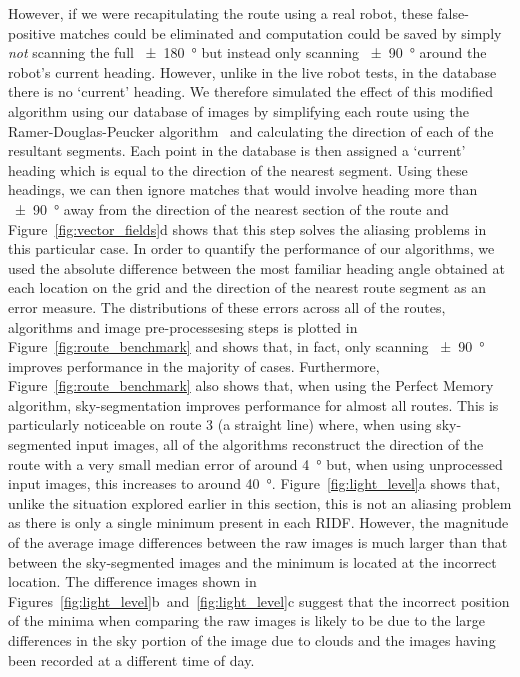 \documentclass[letterpaper]{article}
\begin{document}
However, if we were recapitulating the route using a real robot, these false-positive matches could be eliminated and computation could be saved by simply \emph{not} scanning the full \SI{\pm 180}{\degree} but instead only scanning \SI{\pm 90}{\degree} around the robot's current heading.
However, unlike in the live robot tests, in the database there is no `current' heading.
We therefore simulated the effect of this modified algorithm using our database of images by simplifying each route using the Ramer-Douglas-Peucker algorithm~\citep{Ramer1972} and calculating the direction of each of the resultant segments.
Each point in the database is then assigned a `current' heading which is equal to the direction of the nearest segment.
Using these headings, we can then ignore matches that would involve heading more than \SI{\pm 90}{\degree} away from the direction of the nearest section of the route and Figure~\ref{fig:vector_fields}d shows that this step solves the aliasing problems in this particular case.
In order to quantify the performance of our algorithms, we used the absolute difference between the most familiar heading angle obtained at each location on the grid and the direction of the nearest route segment as an error measure.
The distributions of these errors across all of the routes, algorithms and image pre-processesing steps is plotted in Figure~\ref{fig:route_benchmark} and shows that, in fact, only scanning \SI{\pm 90}{\degree} improves performance in the majority of cases.
Furthermore, Figure~\ref{fig:route_benchmark} also shows that, when using the Perfect Memory algorithm, sky-segmentation improves performance for almost all routes.
This is particularly noticeable on route 3 (a straight line) where, when using sky-segmented input images, all of the algorithms reconstruct the direction of the route with a very small median error of around \SI{4}{\degree} but, when using unprocessed input images, this increases to around \SI{40}{\degree}.
Figure~\ref{fig:light_level}a shows that, unlike the situation explored earlier in this section, this is not an aliasing problem as there is only a single minimum present in each RIDF.
However, the magnitude of the average image differences between the raw images is much larger than that between the sky-segmented images and the minimum is located at the incorrect location.
The difference images shown in Figures~\ref{fig:light_level}b~and~\ref{fig:light_level}c suggest that the incorrect position of the minima when comparing the raw images is likely to be due to the large differences in the sky portion of the image due to clouds and the images having been recorded at a different time of day.
\end{document}
